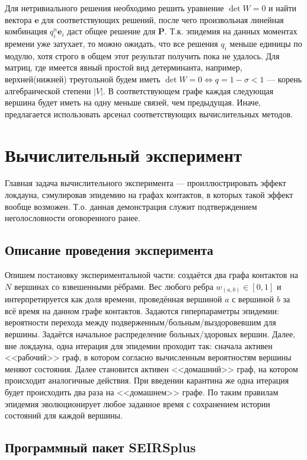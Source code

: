 	 Для нетривиального решения необходимо решить уравнение $\det W = 0$ и найти вектора $\mathbf{e}$ для соответствующих решений, после чего произвольная линейная комбинация $q_i^n \mathbf{e}_i$ даст общее решение для $\mathbf{P}$. Т.к. эпидемия на данных моментах времени уже затухает, то можно ожидать, что все решения $q_i$ меньше единицы по модулю, хотя строго в общем этот результат получить пока не удалось. Для матриц, где имеется явный простой вид детерминанта, например, верхней(нижней) треугольной будем иметь $\det W = 0 \Leftrightarrow q = 1 - \sigma < 1$ --- корень алгебраической степени $|V|$. В соответствующем графе каждая следующая вершина будет иметь на одну меньше связей, чем предыдущая. Иначе, предлагается использовать арсенал соответствующих вычислительных методов.
	
	\section*{Вычислительный эксперимент}
	
	Главная задача вычислительного эксперимента --- проиллюстрировать эффект локдауна, сэмулировав эпидемию на графах контактов, в которых такой эффект вообще возможен. Т.о. данная демонстрация служит подтверждением неголословности оговоренного ранее.
	
	\subsection*{Описание проведения эксперимента}
	
	Опишем постановку экспериментальной части: создаётся два графа контактов на $ N $ вершинах со взвешенными рёбрами. Вес любого ребра $ w_{(a, b)} \in [0, 1] $ и интерпретируется как доля времени, проведённая вершиной $ a $ с вершиной $ b $ за всё время на данном графе контактов. Задаются гиперпараметры эпидемии: вероятности перехода между подверженным/больным/выздоровевшим для вершины. Задаётся начальное распределение больных/здоровых вершин. Далее, вне локдауна, одна итерация для эпидемии проходит так: сначала активен <<рабочий>> граф, в котором согласно вычисленным вероятностям вершины меняют состояния. Далее становится активен <<домашний>> граф, на котором происходит аналогичные действия. При введении карантина же одна итерация будет происходить два раза на <<домашнем>> графе. По таким правилам эпидемия эволюционирует любое заданное время с сохранением истории состояний для каждой вершины.
	
	\subsection*{Программный пакет SEIRSplus}
	
